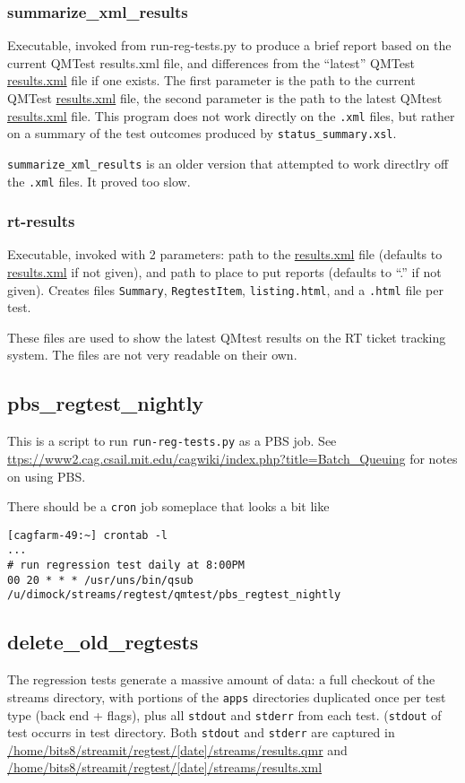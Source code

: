 \documentclass[11pt]{article}
\begin{document}
\subsubsection{summarize\_xml\_results}
Executable, invoked from run-reg-tests.py to produce a brief report based on
the current QMTest results.xml file, and differences from the ``latest''
QMTest \url{results.xml} file if one exists. The first parameter is the path to
the current QMTest \url{results.xml} file, the second parameter is the path to
the latest QMtest \url{results.xml} file. 
This program does not work directly on the {\tt .xml} files, but
rather on a summary of the test outcomes produced by {\tt  status\_summary.xsl}.

{\tt summarize\_xml\_results} is an older version that attempted to
work directlry off the {\tt .xml} files.  It proved too slow.


\subsubsection{rt-results}
Executable, invoked with 2 parameters: path to the \url{results.xml} file (defaults
to \url{results.xml} if not given), 
and path to place to put reports (defaults to ``.'' if not given).
Creates files 
{\tt Summary}, 
{\tt RegtestItem}, 
{\tt listing.html},
and a {\tt .html} file per test.

These files are used to show the latest QMtest results on the 
RT ticket tracking system. 
 The files are not very readable on their own.

\subsection{pbs\_regtest\_nightly}
This is a script to run {\tt run-reg-tests.py} as a PBS job.
See \url{ttps://www2.cag.csail.mit.edu/cagwiki/index.php?title=Batch_Queuing}
for notes on using PBS.

There should be a {\tt cron} job someplace that looks a bit like
{\small{
\begin{verbatim}
[cagfarm-49:~] crontab -l
...
# run regression test daily at 8:00PM
00 20 * * * /usr/uns/bin/qsub /u/dimock/streams/regtest/qmtest/pbs_regtest_nightly
\end{verbatim}
}}
\subsection{delete\_old\_regtests}
The regression tests generate a massive amount of data: 
a full checkout of the streams directory, with portions of the {\tt apps} 
directories duplicated once per test type (back end + flags), plus all 
{\tt stdout} and {\tt stderr} from each test. ({\tt stdout} of test occurrs
in test directory.  Both {\tt stdout} and {\tt stderr} are captured in 
\url{/home/bits8/streamit/regtest/[date]/streams/results.qmr}
and \url{/home/bits8/streamit/regtest/[date]/streams/results.xml}
\end{document}
